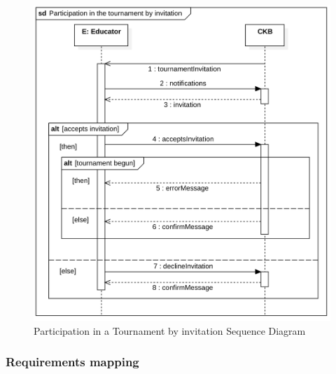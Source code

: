 \clearpage
\begin{figure}[h]
    \centering
    \includegraphics[scale=0.6]{images/SD/ParticipationTournamentInvitationSD.png} 
    \caption{Participation in a Tournament by invitation Sequence Diagram}
    \label{fig_SignUpTournamentSD}
\end{figure}




\subsubsection{Requirements mapping}

\renewcommand{\arraystretch}{1.5}
\vspace{1\baselineskip}

